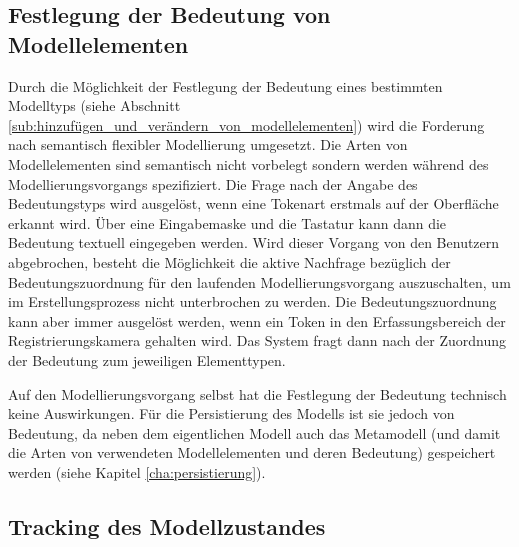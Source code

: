 
\subsection{Festlegung der Bedeutung von Modellelementen} %
\label{sub:festlegung_der_bedeutung_von_modellelementen}

Durch die Möglichkeit der Festlegung der Bedeutung eines bestimmten Modelltyps (siehe Abschnitt \ref{sub:hinzufügen_und_verändern_von_modellelementen}) wird die Forderung nach semantisch flexibler Modellierung umgesetzt. Die Arten von Modellelementen sind semantisch nicht vorbelegt sondern werden während des Modellierungsvorgangs spezifiziert. Die Frage nach der  Angabe des Bedeutungstyps wird ausgelöst, wenn eine Tokenart erstmals auf der Oberfläche erkannt wird. Über eine Eingabemaske und die Tastatur kann dann die Bedeutung textuell eingegeben werden. Wird dieser Vorgang von den Benutzern abgebrochen, besteht die Möglichkeit die aktive Nachfrage bezüglich der Bedeutungszuordnung für den laufenden Modellierungsvorgang auszuschalten, um im Erstellungsprozess nicht unterbrochen zu werden. Die Bedeutungszuordnung kann aber immer ausgelöst werden, wenn ein Token in den Erfassungsbereich der Registrierungskamera gehalten wird. Das System fragt dann nach der Zuordnung der Bedeutung zum jeweiligen Elementtypen.

Auf den Modellierungsvorgang selbst hat die Festlegung der Bedeutung technisch keine Auswirkungen. Für die Persistierung des Modells ist sie jedoch von Bedeutung, da neben dem eigentlichen Modell auch das Metamodell (und damit die Arten von verwendeten Modellelementen und deren Bedeutung) gespeichert werden (siehe Kapitel \ref{cha:persistierung}).


\subsection{Tracking des Modellzustandes} %
\label{sub:tracking_des_modellzustandes}

